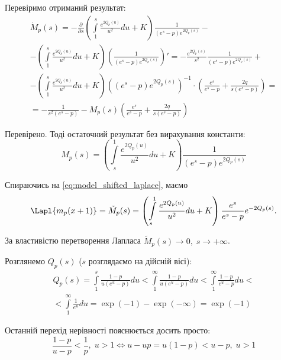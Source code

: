 Перевіримо отриманий результат:
\begin{gather*}
\dot M_{p}(s) = - \frac{\partial}{\partial s}\left( \int\limits_1^s \frac{e^{2Q_p(u)}}{u^2} du + K \right) \frac{1}{(e^s - p)  e^{2Q_p(s)}} - \\
-\left( \int\limits_1^s \frac{e^{2Q_p(u)}}{u^2} du + K \right) \left(\frac{1}{(e^s - p)  e^{2Q_p(s)}}\right)' = -\frac{e^{2Q_p(s)}}{s^2} \frac{1}{(e^s - p)  e^{2Q_p(s)}}  +\\
- \left( \int\limits_1^s \frac{e^{2Q_p(u)}}{u^2} du + K \right) 
 \left((e^s - p)  e^{2Q_p(s)}\right)^{-1} \cdot \left(\frac{e^s}{e^s - p}  + \frac{2q}{s(e^s - p)}   \right)=\\
 = -\frac{1}{s^2(e^s - p)} - M_{p}(s)\left(\frac{e^s}{e^s - p}  + \frac{2q}{s(e^s - p)}   \right)
\end{gather*}

Перевірено. Тоді остаточний результат без вирахування константи:
\begin{equation}
\label{eq:model_laplace_sol_initial}
M_p(s)= \left( \int\limits_s^1 \frac{e^{2Q_p(u)}}{u^2} du + K \right) \frac{1}{(e^s - p)  e^{2Q_p(s)}}
\end{equation}

Спираючись на \eqref{eq:model_shifted_laplace}, маємо
\begin{equation}
\Lapl{m_p(x+1)} =\tilde M_p(s)= \left( \int\limits_s^1 \frac{e^{2Q_p(u)}}{u^2} du + K \right) \frac{e^s}{e^s - p} e^{- 2Q_p(s)}.
\end{equation}

За властивістю перетворення Лапласа $\tilde M_p(s) \rightarrow 0,\; s \rightarrow +\infty$. 

Розглянемо $Q_p(s)$ ($s$ розглядаємо на дійсній вісі):
\begin{equation}
\begin{gathered}
\label{eq:q_p_s_major}
Q_p(s) = \int\limits_1^s \frac{1-p}{u(e^u - p)} du <  \int\limits_1^\infty \frac{1 - p}{u(e^u - p)} du < 
\int\limits_1^\infty \frac{1- p}{e^u - p} du<\\
< \int\limits_1^\infty \frac{1}{e^u} du = \exp(-1) - \exp(-\infty) = \exp(-1)
\end{gathered}
\end{equation}

Останній перехід нерівності пояснюється досить просто:
$$
\frac{1-p}{u - p} < \frac{1}{p}, \; u > 1 \Leftrightarrow u - u p = u(1-p) < u - p, \; u > 1
$$

